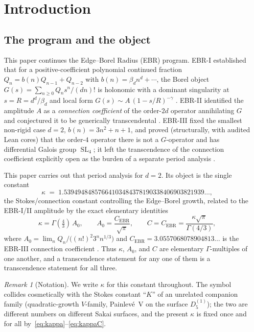 \documentclass[11pt,reqno]{amsart}
\theoremstyle{plain}
\theoremstyle{definition}
\theoremstyle{remark}
\newtheorem{remark}[theorem]{Remark}
\newcommand{\SL}{\operatorname{SL}}
\newcommand{\Cebr}{C_{\mathrm{EBR}}}
\begin{document}
\section{Introduction}\label{sec:intro}

\subsection{The program and the object}
This paper continues the Edge--Borel Radius (EBR) program. EBR-I established
that for a positive-coefficient polynomial continued fraction
$Q_{n}=b(n)Q_{n-1}+Q_{n-2}$ with $b(n)=\beta_{d}n^{d}+\cdots$, the Borel object
$G(s)=\sum_{n\ge0}Q_{n}s^{n}/(dn)!$ is holonomic with a dominant singularity at
$s=R=d^{d}/\beta_{d}$ and local form $G(s)\sim A\,(1-s/R)^{-\gamma}$
\cite{EBRI}. EBR-II identified the amplitude $A$ as a \emph{connection
coefficient} of the order-$2d$ operator annihilating $G$ and conjectured it to
be generically transcendental \cite{EBRII}. EBR-III fixed the smallest
non-rigid case $d=2$, $b(n)=3n^{2}+n+1$, and proved (structurally, with audited
Lean cores) that the order-$4$ operator there is not a $G$-operator and has
differential Galois group $\SL_{4}$; it left the transcendence of the
connection coefficient explicitly open as the burden of a separate period
analysis \cite{EBRIII}.

This paper carries out that period analysis for $d=2$. Its object is the single
constant
\begin{equation}\label{eq:kappa}
  \kappa \;=\; 1.53949484857664103484378190338406903821939\ldots,
\end{equation}
the Stokes/connection constant controlling the Edge--Borel growth, related to
the EBR-I/II amplitude by the exact elementary identities
\begin{equation}\label{eq:kappaC}
  \kappa=\Gamma(\tfrac43)\,A_{0},\qquad
  A_{0}=\frac{\Cebr}{\sqrt{\pi}},\qquad
  C=\Cebr=\frac{\kappa\sqrt{\pi}}{\Gamma(4/3)},
\end{equation}
where $A_{0}=\lim_{n}Q_{n}/\bigl((n!)^{2}3^{n}n^{1/3}\bigr)$ and
$\Cebr=3.0557068078904813\ldots$ is the EBR-III connection coefficient
\cite{EBRIII}. Thus $\kappa$, $A_{0}$, and $C$ are elementary $\Gamma$-multiples
of one another, and a transcendence statement for any one of them is a
transcendence statement for all three.

\begin{remark}[Notation]\label{rem:kappa-name}
We write $\kappa$ for this constant throughout. The symbol collides
cosmetically with the Stokes constant ``$K$'' of an unrelated companion family
(quadratic-growth $V$-family, Painlev\'e~V on the surface $D_{5}^{(1)}$); the
two are different numbers on different Sakai surfaces, and the present $\kappa$
is fixed once and for all by~\eqref{eq:kappa}--\eqref{eq:kappaC}.
\end{remark}
\end{document}
